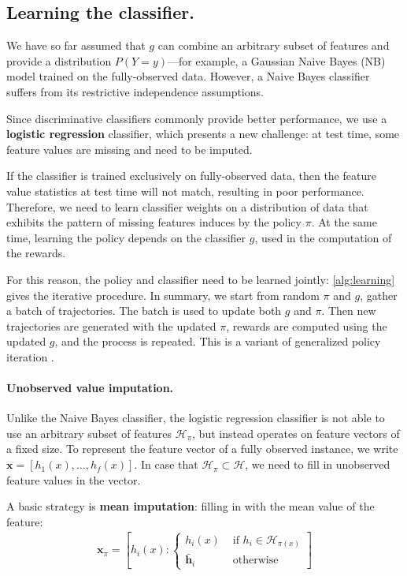 \subsection{Learning the classifier.}\label{sec:classifier}

We have so far assumed that $g$ can combine an arbitrary subset of features and provide a distribution $P(Y = y)$---for example, a Gaussian Naive Bayes (NB) model trained on the fully-observed data.
However, a Naive Bayes classifier suffers from its restrictive independence assumptions.

Since discriminative classifiers commonly provide better performance, we use a \textbf{logistic regression} classifier, which presents a new challenge: at test time, some feature values are missing and need to be imputed.

If the classifier is trained exclusively on fully-observed data, then the feature value statistics at test time will not match, resulting in poor performance.
Therefore, we need to learn classifier weights on a distribution of data that exhibits the pattern of missing features induces by the policy $\pi$.
At the same time, learning the policy depends on the classifier $g$, used in the computation of the rewards.

For this reason, the policy and classifier need to be learned jointly: \autoref{alg:learning} gives the iterative procedure.
In summary, we start from random $\pi$ and $g$, gather a batch of trajectories.
The batch is used to update both $g$ and $\pi$.
Then new trajectories are generated with the updated $\pi$, rewards are computed using the updated $g$, and the process is repeated.
This is a variant of generalized policy iteration \cite{Sutton1998}.

\paragraph{Unobserved value imputation.}
Unlike the Naive Bayes classifier, the logistic regression classifier is not able to use an arbitrary subset of features $\mathcal{H}_\pi$, but instead operates on feature vectors of a fixed size.
To represent the feature vector of a fully observed instance, we write $\mathbf{x} = [h_1(x), \dots, h_f(x)]$.
In case that $\mathcal{H}_\pi \subset \mathcal{H}$, we need to fill in unobserved feature values in the vector.

A basic strategy is \textbf{mean imputation}: filling in with the mean value of the feature:
\begin{align}
\mathbf{x}_\pi = \left[ h_i(x) : \left\{ \begin{array}{rl}
 h_i(x) &\mbox{ if $h_i \in \mathcal{H}_{\pi(x)}$} \\
 \bar{\mathbf{h}}_i &\mbox{ otherwise}
\end{array} \right. \right]
\end{align}

